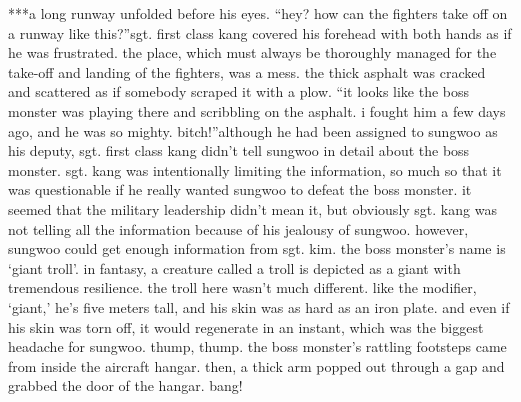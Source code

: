 ***a long runway unfolded before his eyes.
“hey? how can the fighters take off on a runway like this?”sgt.
 first class kang covered his forehead with both hands as if he was frustrated.
the place, which must always be thoroughly managed for the take-off and landing of the fighters, was a mess.
the thick asphalt was cracked and scattered as if somebody scraped it with a plow.
“it looks like the boss monster was playing there and scribbling on the asphalt.
 i fought him a few days ago, and he was so mighty.
 bitch!”although he had been assigned to sungwoo as his deputy, sgt.
 first class kang didn’t tell sungwoo in detail about the boss monster.
 sgt.
 kang was intentionally limiting the information, so much so that it was questionable if he really wanted sungwoo to defeat the boss monster.
it seemed that the military leadership didn’t mean it, but obviously sgt.
 kang was not telling all the information because of his jealousy of sungwoo.
however, sungwoo could get enough information from sgt.
 kim.
the boss monster’s name is ‘giant troll’.
in fantasy, a creature called a troll is depicted as a giant with tremendous resilience.
the troll here wasn’t much different.
 like the modifier, ‘giant,’ he’s five meters tall, and his skin was as hard as an iron plate.
 and even if his skin was torn off, it would regenerate in an instant, which was the biggest headache for sungwoo.
thump, thump.
the boss monster’s rattling footsteps came from inside the aircraft hangar.
 then, a thick arm popped out through a gap and grabbed the door of the hangar.
bang!

 